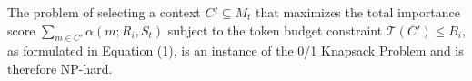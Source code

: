 \begin{proposition}
\label{prop:nphard}
The problem of selecting a context $C' \subseteq M_t$ that maximizes the total importance score $\sum_{m \in C'} \alpha(m; R_i, S_t)$ subject to the token budget constraint $\mathcal{T}(C') \le B_i$, as formulated in Equation (1), is an instance of the 0/1 Knapsack Problem and is therefore NP-hard.
\end{proposition}

